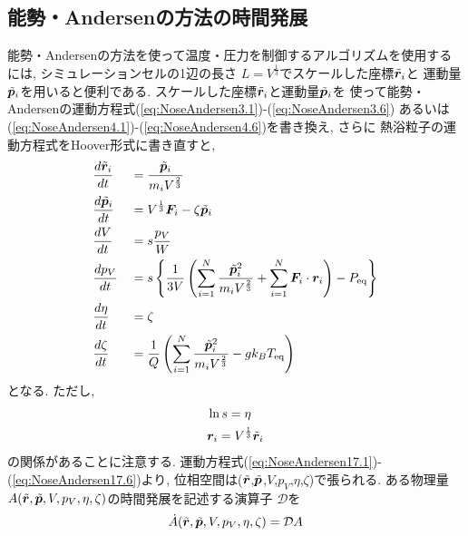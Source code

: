\subsection{能勢・Andersenの方法の時間発展}
能勢・Andersenの方法を使って温度・圧力を制御するアルゴリズムを使用するには, シミュレーションセルの1辺の長さ
$L = V^{\frac{1}{3}}$でスケールした座標$\Tilde{\bm{r}}_{i}$と
運動量$\Tilde{\bm{p}}_{i}$を用いると便利である. 
スケールした座標$\Tilde{\bm{r}}_{i}$と運動量$\Tilde{\bm{p}}_{i}$を
使って能勢・Andersenの運動方程式(\ref{eq:NoseAndersen3.1})-(\ref{eq:NoseAndersen3.6})
あるいは(\ref{eq:NoseAndersen4.1})-(\ref{eq:NoseAndersen4.6})を書き換え, さらに
熱浴粒子の運動方程式をHoover形式に書き直すと, 
\begin{alignat}{2}
 &\frac{d \Tilde{\bm{r}}_{i}}{d t}
 &&=
 \frac{\Tilde{\bm{p}}_{i}}{m_{i} V^{\frac{2}{3}}}
 \label{eq:NoseAndersen17.1}
 \\
 &\frac{d \Tilde{\bm{p}}_{i}}{d t}
 &&=
 V^{\frac{1}{3}}\bm{F}_{i} - \zeta \Tilde{\bm{p}}_{i}
 \label{eq:NoseAndersen17.2}
 \\
 &\frac{d V}{d t}
 &&= s \frac{p_{V}}{W}
 \label{eq:NoseAndersen17.3}
 \\
 &\frac{d p_{V}}{d t}
 &&= s
    \left\{
           \frac{1}{3V}
      \left(
         \sum_{i=1}^{N} \frac{\Tilde{\bm{p}}_{i}^{2}}{m_{i} V^{\frac{2}{3}}}
       + \sum_{i=1}^{N} \bm{F}_{i} \cdot \bm{r}_{i}
      \right)
    - P_{\mathrm{eq}}
    \right\}
 \label{eq:NoseAndersen17.4}
 \\
 &\frac{d \eta}{d t}
 &&=
 \zeta
 \label{eq:NoseAndersen17.5}
 \\
 &\frac{d \zeta}{d t}
 &&=
 \frac{1}{Q}
 \left(
 \sum_{i=1}^{N} \frac{\Tilde{\bm{p}}_{i}^{2}}{m_{i} V^{\frac{2}{3}}} - g k_{B} T_{\mathrm{eq}}
 \right)
 \label{eq:NoseAndersen17.6}
\end{alignat}
となる. ただし, 
\begin{align}
 &\ln s = \eta
 \label{eq:NoseAndersen18.1}
 \\
 &\bm{r}_{i} = V^{\frac{1}{3}} \Tilde{\bm{r}}_{i}
 \label{eq:NoseAndersen18.2}
\end{align}
の関係があることに注意する. 
運動方程式(\ref{eq:NoseAndersen17.1})-(\ref{eq:NoseAndersen17.6})より, 
位相空間は($\Tilde{\bm{r}}$,$\Tilde{\bm{p}}$,$V$,$p_{V}$,$\eta$,$\zeta$)で張られる. 
ある物理量$A(\Tilde{\bm{r}},\Tilde{\bm{p}},V,p_{V},\eta,\zeta)$の時間発展を記述する演算子
$\mathcal{D}$を
\begin{equation}
 \dot{A}(\Tilde{\bm{r}},\Tilde{\bm{p}},V,p_{V},\eta,\zeta) = \mathcal{D} A
 \label{eq:NoseAndersen19}
\end{equation}
